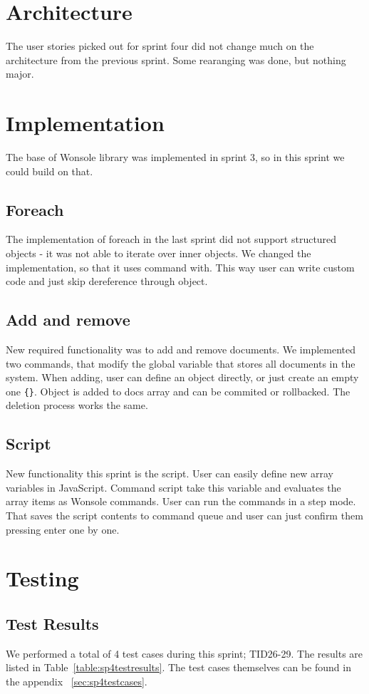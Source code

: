 \section{Architecture}
The user stories picked out for sprint four did not change much on the architecture from the previous sprint. Some rearanging was done, but nothing major.

\section{Implementation}
The base of Wonsole library was implemented in sprint 3, so in this sprint we
could build on that.

\subsection{Foreach}
The implementation of foreach in the last sprint did not support structured
objects - it was not able to iterate over inner objects. We changed the
implementation, so that it uses command with. This way user can write custom
code and just skip dereference through object.

\subsection{Add and remove}
New required functionality was to add and remove documents. We implemented two
commands, that modify the global variable that stores all documents in the
system. When adding, user can define an object directly, or just create an empty
one \verb|{}|. Object is added to docs array and can be commited or rollbacked.
The deletion process works the same.

\subsection{Script}
New functionality this sprint is the script. User can easily define new array
variables in JavaScript. Command script take this variable and evaluates the
array items as Wonsole commands.  User can run the commands in a step mode. That
saves the script contents to command queue and user can just confirm them
pressing enter one by one.



\section{Testing}
\subsection{Test Results}
We performed a total of 4 test cases during this sprint; TID26-29. The results are listed in Table~\ref{table:sp4testresults}. The test cases themselves can be found in the appendix ~\ref{sec:sp4testcases}.

